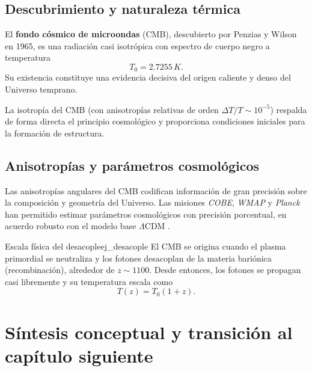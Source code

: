 \subsection{Descubrimiento y naturaleza térmica}

El \textbf{fondo cósmico de microondas} (CMB), descubierto por Penzias y Wilson en 1965, es una radiación casi isotrópica con espectro de cuerpo negro a temperatura
\begin{equation}
  T_0 = 2.7255\,\si{K}.
\end{equation}
Su existencia constituye una evidencia decisiva del origen caliente y denso del Universo temprano.

\begin{importante}
La isotropía del CMB (con anisotropías relativas de orden $\Delta T/T\sim10^{-5}$) respalda de forma directa el principio cosmológico y proporciona condiciones iniciales para la formación de estructura.
\end{importante}

\subsection{Anisotropías y parámetros cosmológicos}

Las anisotropías angulares del CMB codifican información de gran precisión sobre la composición y geometría del Universo. Las misiones \textit{COBE}, \textit{WMAP} y \textit{Planck} han permitido estimar parámetros cosmológicos con precisión porcentual, en acuerdo robusto con el modelo base $\Lambda$CDM \cite{Planck2020}.

\begin{ejemplo}{Escala física del desacople}{ej_desacople}
El CMB se origina cuando el plasma primordial se neutraliza y los fotones desacoplan de la materia bariónica (recombinación), alrededor de $z\sim1100$. Desde entonces, los fotones se propagan casi libremente y su temperatura escala como
\begin{equation}
  T(z) = T_0(1+z).
\end{equation}
\end{ejemplo}

\section{Síntesis conceptual y transición al capítulo siguiente}
\label{sec:sintesis_cap10}

